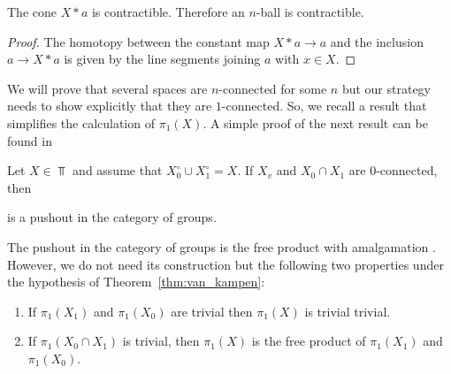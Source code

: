 \documentclass{standalone}
\begin{document}
	\begin{proposition}\label{prop:cone_contract}
		The cone $X\ast a$ is contractible. Therefore an $n$-ball is contractible.
	\end{proposition}
	
	\begin{proof}
		The homotopy between the constant map $X\ast a\rightarrow a$ and the inclusion $a\rightarrow X\ast a$ is given by the line segments joining $a$ with $x\in X$.
	\end{proof}
	
	We will prove that several spaces are $n$-connected for some $n$ but our strategy needs to show explicitly that they are $1$-connected. So, we recall a result that simplifies the calculation of $\pi_{1}(X)$. A simple proof of the next result can be found in \cite[Theorem 2.6.2]{dieck:2008:algebraic:topology}
	\begin{theorem}\label{thm:van_kampen}
		Let $X\in\Top$ and assume that $X^{\circ}_{0}\cup X^{\circ}_{1}=X$. If $X_{v}$ and $X_{0}\cap X_{1}$ are $0$-connected, then
		\begin{center}
		\end{center}
		is a pushout in the category of groups.
	\end{theorem}
	\begin{remark}\label{rem:free_product}
		The pushout in the category of groups is the free product with amalgamation \cite[Chapter 11]{rotman:1995:groups}. However, we do not need its construction but the following two properties under the hypothesis of Theorem~\ref{thm:van_kampen}:
		\begin{enumerate}
			\item If $\pi_{1}(X_{1})$ and $\pi_{1}(X_{0})$ are trivial then $\pi_{1}(X)$ is trivial trivial.
			\item If $\pi_{1}(X_{0}\cap X_{1})$ is trivial, then $\pi_{1}(X)$ is the free product of $\pi_{1}(X_{1})$ and $\pi_{1}(X_{0})$.
		\end{enumerate}
	\end{remark} 
	
\end{document}
